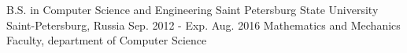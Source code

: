 

\begin{cventries}

  \cventry
    {B.S. in Computer Science and Engineering} %
    {Saint Petersburg State University} %
    {Saint-Petersburg, Russia} %
    {Sep. 2012 - Exp. Aug. 2016} %
    {Mathematics and Mechanics Faculty, department of Computer Science}
\end{cventries}
